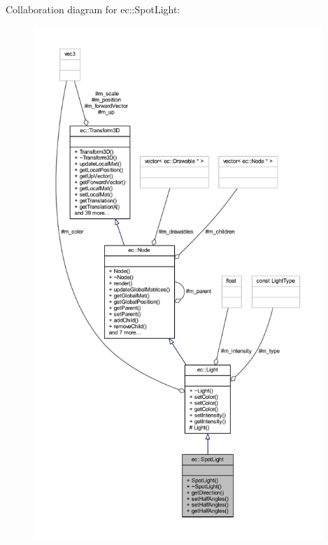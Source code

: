 Collaboration diagram for ec\+:\+:Spot\+Light\+:\nopagebreak
\begin{figure}[H]
\begin{center}
\leavevmode
\includegraphics[height=550pt]{classec_1_1_spot_light__coll__graph}
\end{center}
\end{figure}
